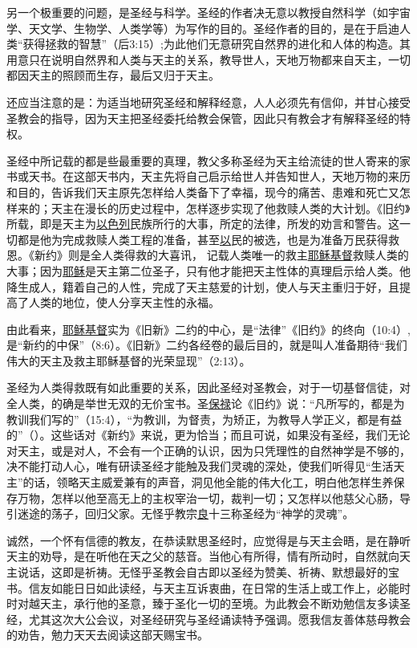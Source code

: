 另一个极重要的问题，是圣经与科学。圣经的作者决无意以教授自然科学（如宇宙学、天文学、生物学、人类学等）为写作的目的。圣经作者的目的，是在于启迪人类“获得拯救的智慧”（后3:15）;为此他们无意研究自然界的进化和人体的构造。其用意只在说明自然界和人类与天主的关系，教导世人，天地万物都来自天主，一切都因天主的照顾而生存，最后又归于天主。

还应当注意的是：为适当地研究圣经和解释经意，人人必须先有信仰，并甘心接受圣教会的指导，因为天主把圣经委托给教会保管，因此只有教会才有解释圣经的特权。

圣经中所记载的都是些最重要的真理，教父多称圣经为天主给流徒的世人寄来的家书或天书。在这部天书内，天主先将自己启示给世人并告知世人，天地万物的来历和目的，告诉我们天主原先怎样给人类备下了幸福，现今的痛苦、患难和死亡又怎样来的；天主在漫长的历史过程中，怎样逐步实现了他救赎人类的大计划。《旧约》所载，即是天主为\uline{以色列}民族所行的大事，所定的法律，所发的劝言和警告。这一切都是他为完成救赎人类工程的准备，甚至\uline{以}民的被选，也是为准备万民获得救恩。《新约》则是全人类得救的大喜讯，
记载人类唯一的救主\uline{耶稣}\uline{基督}救赎人类的大事；因为\uline{耶稣}是天主第二位圣子，只有他才能把天主性体的真理启示给人类。他降生成人，籍着自己的人性，完成了天主慈爱的计划，使人与天主重归于好，且提高了人类的地位，使人分享天主性的永福。

由此看来，\uline{耶稣}\uline{基督}实为《旧新》二约的中心，是“法律”《旧约》的终向（10:4）,是“新约的中保”（8:6）。《旧新》二约各经卷的最后目的，就是叫人准备期待“我们伟大的天主及救主耶稣基督的光荣显现”（2:13）。

圣经为人类得救既有如此重要的关系，因此圣经对圣教会，对于一切基督信徒，对全人类，的确是举世无双的无价宝书。圣\uline{保禄}论《旧约》说：“凡所写的，都是为教训我们写的”（15:4），“为教训，为督责，为矫正，为教导人学正义，都是有益的”（）。这些话对《新约》来说，更为恰当；而且可说，如果没有圣经，我们无论对天主，或是对人，不会有一个正确的认识，因为只凭理性的自然神学是不够的，决不能打动人心，唯有研读圣经才能触及我们灵魂的深处，使我们听得见“生活天主”的话，领略天主威爱兼有的声音，洞见他全能的伟大化工，明白他怎样生养保存万物，怎样以他至高无上的主权宰治一切，裁判一切；又怎样以他慈父心肠，导引迷途的荡子，回归父家。无怪乎教宗\uline{良}十三称圣经为“神学的灵魂”。

诚然，一个怀有信德的教友，在恭读默思圣经时，应觉得是与天主会晤，是在静听天主的劝导，是在听他在天之父的慈音。当他心有所得，情有所动时，自然就向天主说话，这即是祈祷。无怪乎圣教会自古即以圣经为赞美、祈祷、默想最好的宝书。信友如能日日如此读经，与天主互诉衷曲，在日常的生活上或工作上，必能时时对越天主，承行他的圣意，臻于圣化一切的至境。为此教会不断劝勉信友多读圣经，尤其这次大公会议，对圣经研究与圣经诵读特予强调。愿我信友善体慈母教会的劝告，勉力天天去阅读这部天赐宝书。